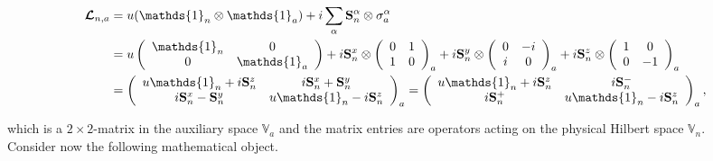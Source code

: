 \documentclass{homework}
\begin{document}
\begin{equation}
    \begin{split}
    \bm{\mathcal{L}}_{n, a} &= u(\mathds{1}_n \otimes \mathds{1}_a) + i \sum_{\alpha} \spin_n^\alpha \otimes \sigma_{a}^\alpha \\
    &= u \left(\begin{array}{cc}
        \mathds{1}_n & 0  \\
        0 & \mathds{1}_a 
    \end{array}\right) + i \spin^{x}_{n} \otimes \left(\begin{array}{cc}
        0 & 1 \\
        1 & 0
    \end{array}\right)_a + i \spin^{y}_{n} \otimes \left(\begin{array}{cc}
        0 & -i \\
        i & 0 
    \end{array}\right)_a + i \spin^{z}_{n} \otimes \left(\begin{array}{cc}
        1 & 0  \\
        0 & -1
    \end{array}\right)_a \\
    &= \left(\begin{array}{cc}
       u \mathds{1}_n + i \spin^{z}_{n} & i \spin^{x}_{n} + \spin^{y}_{n} \\
       i \spin^{x}_{n} - \spin^{y}_{n}  & u \mathds{1}_n - i \spin^{z}_{n}
    \end{array}\right)_a = \left(\begin{array}{cc}
       u \mathds{1}_n + i \spin^{z}_{n} & i \spin^{-}_{n} \\
       i \spin^{+}_{n} & u \mathds{1}_n - i \spin^{z}_{n}
    \end{array}\right)_a,
    \end{split}
\end{equation}
    
which is a $2 \times 2$-matrix in the auxiliary space $\mathds{V}_a$ and the matrix entries are operators acting on the physical Hilbert space $\mathds{V}_n$. \\

Consider now the following mathematical object. 
\end{document}

